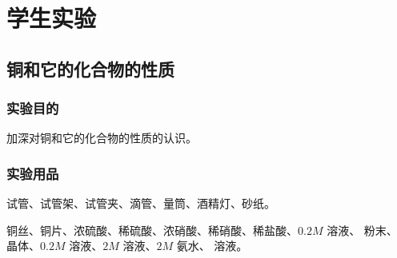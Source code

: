 \chapter*{学生实验}
\renewcommand{\thefigure}{\arabic{figure}}
\renewcommand{\thetable}{\arabic{table}}

\section{铜和它的化合物的性质}
\subsection*{实验目的}
加深对铜和它的化合物的性质的认识。

\subsection*{实验用品}
试管、试管架、试管夹、滴管、量筒、酒精灯、砂纸。

铜丝、铜片、浓硫酸、稀硫酸、浓硝酸、稀硝酸、稀盐酸、$0.2M$  溶液、 粉末、 晶体、$0.2M$  溶液、$2M$  溶液、$2M$ 氨水、 溶液。

